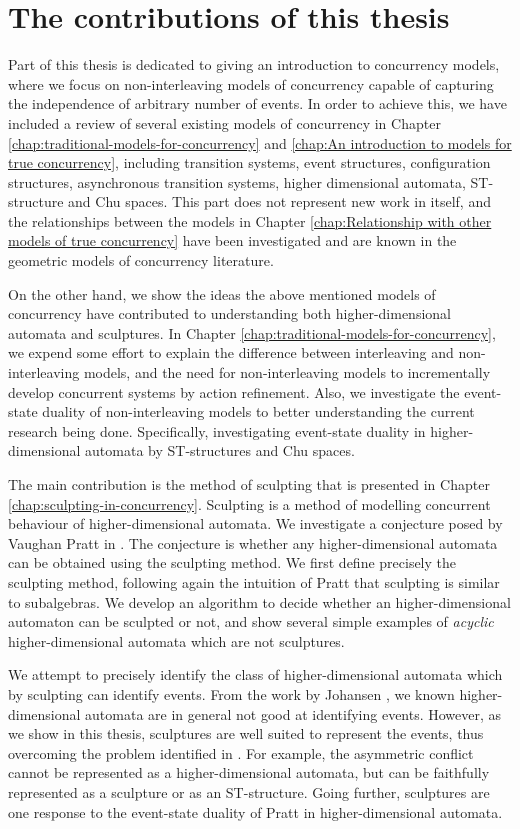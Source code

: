 \section{The contributions of this thesis}
    Part of this thesis is dedicated to giving an introduction to concurrency models, where we focus on non-interleaving models of concurrency capable of capturing the independence of arbitrary number of events. In order to achieve this, we have included a review of several existing models of concurrency in Chapter \ref{chap:traditional-models-for-concurrency} and \ref{chap:An introduction to models for true concurrency}, including transition systems, event structures, configuration structures, asynchronous transition systems, higher dimensional automata, ST-structure and Chu spaces. This part does not represent new work in itself, and the relationships between the models in Chapter \ref{chap:Relationship with other models of true concurrency} have been investigated and are known in the geometric models of concurrency literature.
    
    On the other hand, we show the ideas the above mentioned models of concurrency have contributed to understanding both higher-dimensional automata and sculptures. In Chapter \ref{chap:traditional-models-for-concurrency}, we expend some effort to explain the difference between interleaving and non-interleaving models, and the need for non-interleaving models to incrementally develop concurrent systems by action refinement. Also, we investigate the event-state duality of non-interleaving models  to better understanding the current research being done. Specifically, investigating event-state duality in higher-dimensional automata by ST-structures and Chu spaces.
    
    The main contribution is the method of sculpting that is presented in Chapter \ref{chap:sculpting-in-concurrency}. Sculpting is a method of modelling concurrent behaviour of higher-dimensional automata. We investigate a conjecture posed by Vaughan Pratt in \cite{Pratt00Sculptures}. The conjecture is whether any higher-dimensional automata can be obtained using the sculpting method. We first define precisely the sculpting method, following again the intuition of Pratt that sculpting is similar to subalgebras. We develop an algorithm to decide whether an higher-dimensional automaton can be sculpted or not, and show several simple examples of \emph{acyclic} higher-dimensional automata which are not sculptures.
    
    We attempt to precisely identify the class of higher-dimensional automata which by sculpting can identify events. From the work by Johansen \cite{Johansen16STstruct}, we known higher-dimensional automata are in general not good at identifying events. However, as we show in this thesis, sculptures are well suited to represent the events, thus overcoming the problem identified in \cite[Figure 5]{Johansen16STstruct}. For example, the asymmetric conflict cannot be represented as a higher-dimensional automata, but can be faithfully represented as a sculpture or as an ST-structure. Going further, sculptures are one response to the event-state duality of Pratt \cite{Pratt02eventStateDuality} in higher-dimensional automata.
    
   